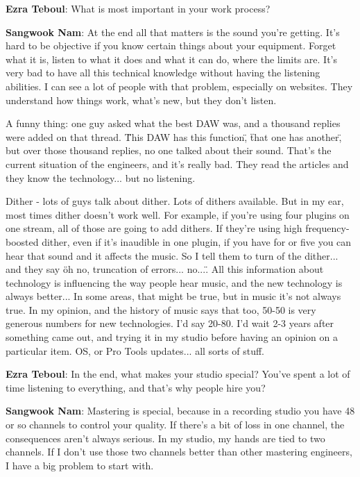 \textbf{Ezra Teboul}: What is most important in your work process?

\textbf{Sangwook Nam}: At the end all that matters is the sound you're getting. It's hard to be objective if you know certain things about your equipment. Forget what it is, listen to what it does and what it can do, where the limits are. It's very bad to have all this technical knowledge without having the listening abilities. I can see a lot of people with that problem, especially on websites. They understand how things work, what's new, but they don't listen.

A funny thing: one guy asked what the best DAW was, and a thousand replies were added on that thread. \"This DAW has this function\", \"that one has another\", but over those thousand replies, no one talked about their sound. That's the current situation of the engineers, and it's really bad. They read the articles and they know the technology... but no listening.

Dither - lots of guys talk about dither. Lots of dithers available. But in my ear, most times dither doesn't work well. For example, if you're using four plugins on one stream, all of those are going to add dithers. If they're using high frequency-boosted dither, even if it's inaudible in one plugin, if you have for or five you can hear that sound and it affects the music. So I tell them to turn of the dither... and they say \"oh no, truncation of errors... no...\". All this information about technology is influencing the way people hear music, and the new technology is always better... In some areas, that might be true, but in music it's not always true. In my opinion, and the history of music says that too, 50-50 is very generous numbers for new technologies. I'd say 20-80. I'd wait 2-3 years after something came out, and trying it in my studio before having an opinion on a particular item. OS, or Pro Tools updates... all sorts of stuff.

\textbf{Ezra Teboul}: In the end, what makes your studio special? You've spent a lot of time listening to everything, and that's why people hire you?

\textbf{Sangwook Nam}: Mastering is special, because in a recording studio you have 48 or so channels to control your quality. If there's a bit of loss in one channel, the consequences aren't always serious. In my studio, my hands are tied to two channels. If I don't use those two channels better than other mastering engineers, I have a big problem to start with.

